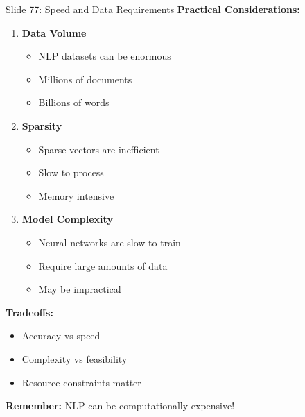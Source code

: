 \documentclass[8pt]{beamer}
\begin{document}
	\begin{frame}{Slide 77: Speed and Data Requirements}
		\fontsize{6.5}{7.5}\selectfont
		\textbf{Practical Considerations:}
		\begin{enumerate}
			\item \textbf{Data Volume}
			\begin{itemize}
				\item NLP datasets can be enormous
				\item Millions of documents
				\item Billions of words
			\end{itemize}
			\item \textbf{Sparsity}
			\begin{itemize}
				\item Sparse vectors are inefficient
				\item Slow to process
				\item Memory intensive
			\end{itemize}
			\item \textbf{Model Complexity}
			\begin{itemize}
				\item Neural networks are slow to train
				\item Require large amounts of data
				\item May be impractical
			\end{itemize}
		\end{enumerate}
		
		\vspace{0.1cm}
		\textbf{Tradeoffs:}
		\begin{itemize}
			\item Accuracy vs speed
			\item Complexity vs feasibility
			\item Resource constraints matter
		\end{itemize}
		
		\textcolor{myblue}{\textbf{Remember:}} NLP can be computationally expensive!
	\end{frame}
	
\end{document}
